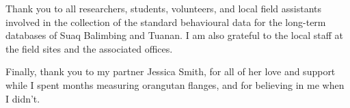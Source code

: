 \begin{acknowledgements}
Thank you to all researchers, students, volunteers, and local field assistants involved in the collection of the standard behavioural data for the long-term databases of Suaq Balimbing and Tuanan. I am also grateful to the local staff at the field sites and the associated offices. 

Finally, thank you to my partner Jessica Smith, for all of her love and support while I spent months measuring orangutan flanges, and for believing in me when I didn't.



\end{acknowledgements}

